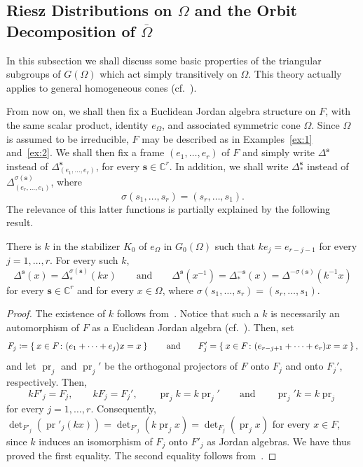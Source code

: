 \documentclass[10.5pt,reqno]{amsart}
\DeclareMathOperator{\pr}{pr}
\newcommand{\vect}[1]{\mathbf{{#1}}}
\newcommand{\C}{\mathds{C}}
\begin{document}
\subsection{Riesz Distributions on $\Omega$ and the Orbit Decomposition of $\overline \Omega$}\label{sec:2:7}

In this subsection we shall discuss some basic properties of the triangular subgroups of $G(\Omega)$ which act simply transitively on $\Omega$. This theory actually applies to general homogeneous cones (cf.~\cite{Vinberg}).

From now on, we shall then fix a Euclidean Jordan algebra structure on $F$, with the same scalar product, identity $e_\Omega$, and associated symmetric cone $\Omega$. Since $\Omega$ is assumed to be irreducible, $F$ may be described as in Examples~\ref{ex:1} and~\ref{ex:2}. We shall then fix a frame $(e_1,\dots,e_r)$ of $F$ and simply write $\Delta^{\vect s}$ instead of $\Delta^{\vect s}_{(e_1,\dots,e_r)}$, for every $\vect s\in \C^r$. In addition, we shall write $\Delta_*^{\vect s}$ instead of $\Delta^{\sigma(\vect s)}_{(e_r,\dots,e_1)}$, where 
\[
\sigma(s_1,\dots, s_r)=(s_r,\dots, s_1).
\]
The relevance of this latter functions is partially explained by the following result.

\begin{prop}\label{prop:3b}
	There is $k$ in the stabilizer $K_0$ of $e_\Omega$ in $G_0(\Omega)$ such that $k e_j= e_{r-j-1}$ for every $j=1,\dots,r$. For every such $k$, 
	\[
	\Delta^{\vect s}(x)=\Delta_*^{\sigma(\vect s)}(k x) \qquad\text{and} \qquad \Delta^{\vect s}(x^{-1})=\Delta_*^{-\vect s}(x)=\Delta^{-\sigma(\vect s)}(k^{-1} x)
	\]
	for every $\vect s\in \C^r$ and for every $x\in \Omega$, where $\sigma(s_1,\dots, s_r)=(s_r,\dots, s_1)$.
\end{prop}

\begin{proof}
	The existence of $k$ follows from~\cite[Corollary IV.2.7]{FarautKoranyi}. Notice that such a $k$ is necessarily an automorphism of $F$ as a Euclidean Jordan algebra (cf.~\cite[Theorem III.5.1]{FarautKoranyi}). Then, set 
	\[
	F_j\coloneqq \Set{x\in F\colon (e_1+\cdots+e_j)x=x}\qquad \text{and} \qquad F'_j= \Set{x\in F\colon (e_{r-j+1}+\cdots+e_r) x=x},
	\]
	and let $\pr_j$ and $\pr_{j}'$ be the orthogonal projectors of $F$ onto $F_j$ and onto $F_j'$, respectively.   Then,
	\[
	k F'_j= F_j, \qquad k F_j=F_{j}', \qquad \pr_j k=k\pr_{j}'\qquad \text{and} \qquad \pr_{j}'k=k\pr_j
	\] 
	for every $j=1,\dots,r$. Consequently, $\det_{F'_j}(\pr'_j(k x))=\det_{F'_j}(k \pr_j x)=\det_{F_j}(\pr_j x)$ for every $x\in F$, since $k$ induces an isomorphism of $F_j$ onto  $F'_j$ as Jordan algebras. We have thus proved the first equality. The second equality follows from~\cite[Proposition VII.1.5]{FarautKoranyi}.
\end{proof}
\end{document}
